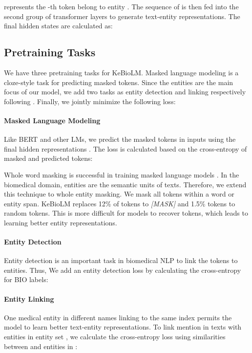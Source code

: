 \documentclass[11pt]{article}
\begin{document}
 represents the -th token belong to entity .
The sequence of 
is then fed into the second group of transformer layers
to generate text-entity representations.
The final hidden states  are calculated as:





\subsection{Pretraining Tasks}
We have three pretraining tasks for KeBioLM.
Masked language modeling is a cloze-style task for predicting masked tokens.
Since the entities are the main focus of our model, we add two tasks as entity detection and linking respectively following \citet{fevry-etal-2020-entities}.
Finally, we jointly minimize the following loss:


\paragraph{Masked Language Modeling}
Like BERT and other LMs, we predict the masked tokens  in inputs using the final hidden representations . The loss  is calculated based on the cross-entropy of masked and predicted tokens:

Whole word masking is successful in training masked language models \cite{devlin-etal-2019-bert,cui2019pre}.
In the biomedical domain, entities are the semantic units of texts.
Therefore, we extend this technique to whole entity masking.
We mask all tokens within a word or entity span.
KeBioLM replaces 12\% of tokens to \textit{[MASK]} and 1.5\% tokens to random tokens.
This is more difficult for models to recover tokens, which leads to learning better entity representations.

\paragraph{Entity Detection}
Entity detection is an important task in biomedical NLP to link the tokens to entities. Thus, We add an entity detection loss by calculating the cross-entropy for BIO labels:



\paragraph{Entity Linking}
One medical entity in different names linking to the same index permits the model to learn better text-entity representations.
To link mention  in texts with entities  in entity set , we calculate the cross-entropy loss using similarities between  and entities in :
\end{document}
